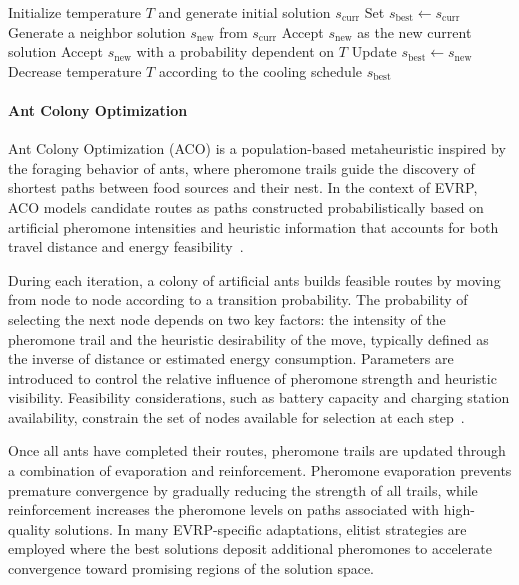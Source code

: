 \begin{algorithm}[H]
\caption{Simulated Annealing for EVRP}
\begin{algorithmic}[1]
\State Initialize temperature $T$ and generate initial solution $s_{\text{curr}}$
\State Set $s_{\text{best}} \gets s_{\text{curr}}$
    \State Generate a neighbor solution $s_{\text{new}}$ from $s_{\text{curr}}$
        \State Accept $s_{\text{new}}$ as the new current solution
    \Else
        \State Accept $s_{\text{new}}$ with a probability dependent on $T$
    \EndIf
        \State Update $s_{\text{best}} \gets s_{\text{new}}$
    \EndIf
    \State Decrease temperature $T$ according to the cooling schedule
\EndWhile
\State \Return $s_{\text{best}}$
\end{algorithmic}
\end{algorithm}


\paragraph{Ant Colony Optimization}

Ant Colony Optimization (ACO) is a population-based metaheuristic inspired by the foraging behavior of ants, where pheromone trails guide the discovery of shortest paths between food sources and their nest. In the context of EVRP, ACO models candidate routes as paths constructed probabilistically based on artificial pheromone intensities and heuristic information that accounts for both travel distance and energy feasibility~\cite{jia2021bilevel, mavrovouniotis2019parallel,mavrovouniotis2018ant}.

During each iteration, a colony of artificial ants builds feasible routes by moving from node to node according to a transition probability. The probability of selecting the next node depends on two key factors: the intensity of the pheromone trail and the heuristic desirability of the move, typically defined as the inverse of distance or estimated energy consumption. Parameters are introduced to control the relative influence of pheromone strength and heuristic visibility. Feasibility considerations, such as battery capacity and charging station availability, constrain the set of nodes available for selection at each step~\cite{mao2020electric}.

Once all ants have completed their routes, pheromone trails are updated through a combination of evaporation and reinforcement. Pheromone evaporation prevents premature convergence by gradually reducing the strength of all trails, while reinforcement increases the pheromone levels on paths associated with high-quality solutions. In many EVRP-specific adaptations, elitist strategies are employed where the best solutions deposit additional pheromones to accelerate convergence toward promising regions of the solution space.

